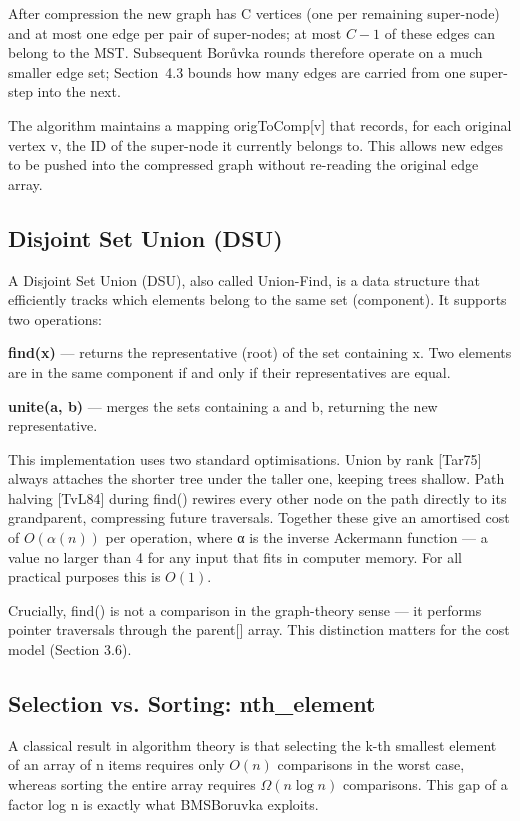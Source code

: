 \documentclass[11pt]{article}
\theoremstyle{plain}
\theoremstyle{remark}
\begin{document}
After compression the new graph has C vertices (one per remaining
super-node) and at most one edge per pair of super-nodes; at most
\(C - 1\) of these edges can belong to the MST. Subsequent Borůvka
rounds therefore operate on a much smaller edge set; Section~4.3 bounds
how many edges are carried from one super-step into the next.

The algorithm maintains a mapping origToComp{[}v{]} that records, for
each original vertex v, the ID of the super-node it currently belongs
to. This allows new edges to be pushed into the compressed graph without
re-reading the original edge array.

\subsection{Disjoint Set Union (DSU)}

A Disjoint Set Union (DSU), also called Union-Find, is a data structure
that efficiently tracks which elements belong to the same set
(component). It supports two operations:

\textbf{find(x)} --- returns the representative (root) of the set
containing x. Two elements are in the same component if and only if
their representatives are equal.

\textbf{unite(a, b)} --- merges the sets containing a and b, returning
the new representative.

This implementation uses two standard optimisations. Union by rank
{[}Tar75{]} always attaches the shorter tree under the taller one,
keeping trees shallow. Path halving {[}TvL84{]} during find() rewires
every other node on the path directly to its grandparent, compressing
future traversals. Together these give an amortised cost of
\(O(\alpha(n))\) per operation, where α is the inverse Ackermann
function --- a value no larger than 4 for any input that fits in
computer memory. For all practical purposes this is \(O(1)\).

Crucially, find() is not a comparison in the graph-theory sense --- it
performs pointer traversals through the parent{[}{]} array. This
distinction matters for the cost model (Section 3.6).

\subsection{Selection vs. Sorting: nth\_element}

A classical result in algorithm theory is that selecting the k-th
smallest element of an array of n items requires only \(O(n)\)
comparisons in the worst case, whereas sorting the entire array requires
\(\Omega\left( n\log n \right)\) comparisons. This gap of a factor log n
is exactly what BMSBoruvka exploits.
\end{document}
